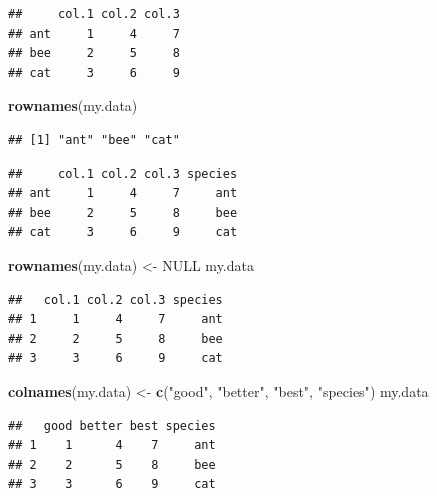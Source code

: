 \documentclass[]{book}
\newenvironment{Shaded}{\begin{snugshade}}{\end{snugshade}}
\newcommand{\KeywordTok}[1]{\textcolor[rgb]{0.13,0.29,0.53}{\textbf{#1}}}
\newcommand{\NormalTok}[1]{#1}
\newcommand{\OperatorTok}[1]{\textcolor[rgb]{0.81,0.36,0.00}{\textbf{#1}}}
\newcommand{\OtherTok}[1]{\textcolor[rgb]{0.56,0.35,0.01}{#1}}
\newcommand{\StringTok}[1]{\textcolor[rgb]{0.31,0.60,0.02}{#1}}
\begin{document}
\begin{verbatim}
##     col.1 col.2 col.3
## ant     1     4     7
## bee     2     5     8
## cat     3     6     9
\end{verbatim}

\begin{Shaded}
\begin{Highlighting}[]
\KeywordTok{rownames}\NormalTok{(my.data)}
\end{Highlighting}
\end{Shaded}

\begin{verbatim}
## [1] "ant" "bee" "cat"
\end{verbatim}

\begin{Shaded}
\end{Shaded}

\begin{verbatim}
##     col.1 col.2 col.3 species
## ant     1     4     7     ant
## bee     2     5     8     bee
## cat     3     6     9     cat
\end{verbatim}

\begin{Shaded}
\begin{Highlighting}[]
\KeywordTok{rownames}\NormalTok{(my.data) <-}\StringTok{ }\OtherTok{NULL}
\NormalTok{my.data}
\end{Highlighting}
\end{Shaded}

\begin{verbatim}
##   col.1 col.2 col.3 species
## 1     1     4     7     ant
## 2     2     5     8     bee
## 3     3     6     9     cat
\end{verbatim}

\begin{Shaded}
\begin{Highlighting}[]
\KeywordTok{colnames}\NormalTok{(my.data) <-}\StringTok{ }\KeywordTok{c}\NormalTok{(}\StringTok{"good"}\NormalTok{, }\StringTok{"better"}\NormalTok{, }\StringTok{"best"}\NormalTok{, }\StringTok{"species"}\NormalTok{)}
\NormalTok{my.data}
\end{Highlighting}
\end{Shaded}

\begin{verbatim}
##   good better best species
## 1    1      4    7     ant
## 2    2      5    8     bee
## 3    3      6    9     cat
\end{verbatim}
\end{document}
